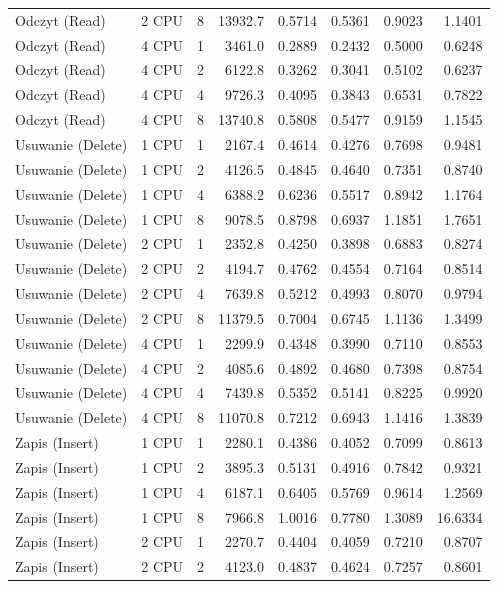 \begin{table}[ht]
{\begin{tabular}{llcrrrrr}
Odczyt (Read) & 2 CPU & 8 & 13932.7 & 0.5714 & 0.5361 & 0.9023 & 1.1401 \\
Odczyt (Read) & 4 CPU & 1 & 3461.0 & 0.2889 & 0.2432 & 0.5000 & 0.6248 \\
Odczyt (Read) & 4 CPU & 2 & 6122.8 & 0.3262 & 0.3041 & 0.5102 & 0.6237 \\
Odczyt (Read) & 4 CPU & 4 & 9726.3 & 0.4095 & 0.3843 & 0.6531 & 0.7822 \\
Odczyt (Read) & 4 CPU & 8 & 13740.8 & 0.5808 & 0.5477 & 0.9159 & 1.1545 \\
Usuwanie (Delete) & 1 CPU & 1 & 2167.4 & 0.4614 & 0.4276 & 0.7698 & 0.9481 \\
Usuwanie (Delete) & 1 CPU & 2 & 4126.5 & 0.4845 & 0.4640 & 0.7351 & 0.8740 \\
Usuwanie (Delete) & 1 CPU & 4 & 6388.2 & 0.6236 & 0.5517 & 0.8942 & 1.1764 \\
Usuwanie (Delete) & 1 CPU & 8 & 9078.5 & 0.8798 & 0.6937 & 1.1851 & 1.7651 \\
Usuwanie (Delete) & 2 CPU & 1 & 2352.8 & 0.4250 & 0.3898 & 0.6883 & 0.8274 \\
Usuwanie (Delete) & 2 CPU & 2 & 4194.7 & 0.4762 & 0.4554 & 0.7164 & 0.8514 \\
Usuwanie (Delete) & 2 CPU & 4 & 7639.8 & 0.5212 & 0.4993 & 0.8070 & 0.9794 \\
Usuwanie (Delete) & 2 CPU & 8 & 11379.5 & 0.7004 & 0.6745 & 1.1136 & 1.3499 \\
Usuwanie (Delete) & 4 CPU & 1 & 2299.9 & 0.4348 & 0.3990 & 0.7110 & 0.8553 \\
Usuwanie (Delete) & 4 CPU & 2 & 4085.6 & 0.4892 & 0.4680 & 0.7398 & 0.8754 \\
Usuwanie (Delete) & 4 CPU & 4 & 7439.8 & 0.5352 & 0.5141 & 0.8225 & 0.9920 \\
Usuwanie (Delete) & 4 CPU & 8 & 11070.8 & 0.7212 & 0.6943 & 1.1416 & 1.3839 \\
Zapis (Insert) & 1 CPU & 1 & 2280.1 & 0.4386 & 0.4052 & 0.7099 & 0.8613 \\
Zapis (Insert) & 1 CPU & 2 & 3895.3 & 0.5131 & 0.4916 & 0.7842 & 0.9321 \\
Zapis (Insert) & 1 CPU & 4 & 6187.1 & 0.6405 & 0.5769 & 0.9614 & 1.2569 \\
Zapis (Insert) & 1 CPU & 8 & 7966.8 & 1.0016 & 0.7780 & 1.3089 & 16.6334 \\
Zapis (Insert) & 2 CPU & 1 & 2270.7 & 0.4404 & 0.4059 & 0.7210 & 0.8707 \\
Zapis (Insert) & 2 CPU & 2 & 4123.0 & 0.4837 & 0.4624 & 0.7257 & 0.8601 \\

\end{tabular}}
\end{table}
